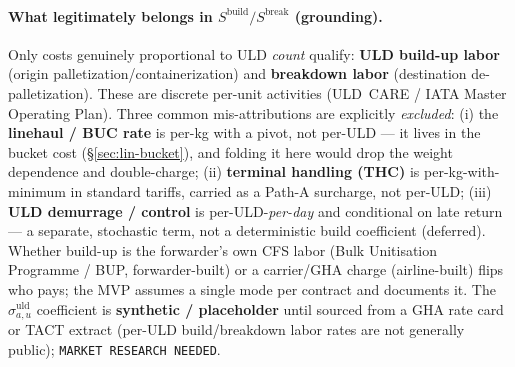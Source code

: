 \documentclass[11pt,a4paper]{article}
\theoremstyle{definition}
\begin{document}
\paragraph{What legitimately belongs in $S^{\text{build}}/S^{\text{break}}$ (grounding).}
Only costs genuinely proportional to ULD \emph{count} qualify: \textbf{ULD
build-up labor} (origin palletization/containerization) and \textbf{breakdown
labor} (destination de-palletization). These are discrete per-unit activities
(ULD~CARE / IATA Master Operating Plan). Three common mis-attributions are
explicitly \emph{excluded}: (i) the \textbf{linehaul / BUC rate} is per-kg with
a pivot, not per-ULD --- it lives in the bucket cost (\S\ref{sec:lin-bucket}),
and folding it here would drop the weight dependence and double-charge; (ii)
\textbf{terminal handling (THC)} is per-kg-with-minimum in standard tariffs,
carried as a Path-A surcharge, not per-ULD; (iii) \textbf{ULD demurrage /
control} is per-ULD-\emph{per-day} and conditional on late return --- a
separate, stochastic term, not a deterministic build coefficient (deferred).
Whether build-up is the forwarder's own CFS labor (Bulk Unitisation
Programme / BUP, forwarder-built) or a carrier/GHA charge (airline-built)
flips who pays; the MVP assumes a single mode per contract and documents it.
The $\sigma^{\text{uld}}_{a,u}$ coefficient is \textbf{synthetic / placeholder}
until sourced from a GHA rate card or TACT extract (per-ULD build/breakdown
labor rates are not generally public); \texttt{MARKET RESEARCH NEEDED}.
\end{document}
